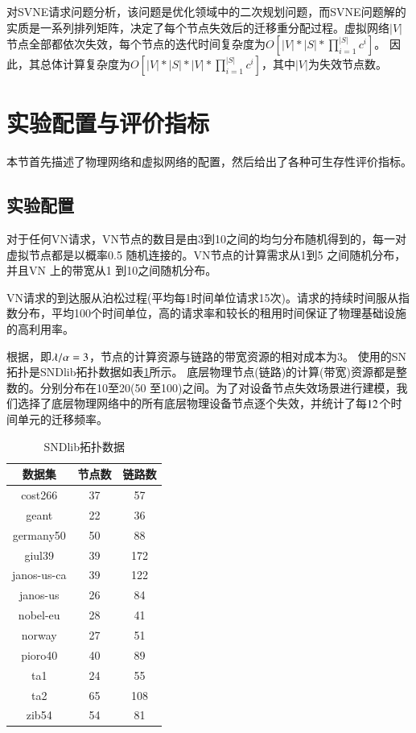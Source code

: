 对SVNE请求问题分析，该问题是优化领域中的二次规划问题，而SVNE问题解的实质是一系列排列矩阵，决定了每个节点失效后的迁移重分配过程。虚拟网络$|V|$节点全部都依次失效，每个节点的迭代时间复杂度为$O[|V|*|S|*\prod_{i=1}^{|S|}c^i]$。 因此，其总体计算复杂度为$O[|V|*|S|*|V|*\prod_{i=1}^{|S|}c^i]$，其中$|V|$为失效节点数。


\section{实验配置与评价指标}
本节首先描述了物理网络和虚拟网络的配置，然后给出了各种可生存性评价指标。
\subsection{实验配置}
对于任何VN请求，VN节点的数目是由3到10之间的均匀分布随机得到的，每一对虚拟节点都是以概率0.5 随机连接的。VN节点的计算需求从1到5 之间随机分布，并且VN 上的带宽从1 到10之间随机分布。

VN请求的到达服从泊松过程(平均每1时间单位请求15次)。请求的持续时间服从指数分布，平均100个时间单位，高的请求率和较长的租用时间保证了物理基础设施的高利用率。

根据\cite{yu2010survivable}，即$\lambda/\alpha=3$，节点的计算资源与链路的带宽资源的相对成本为3。 使用的SN 拓扑是SNDlib拓扑数据\cite{orlowski2010sndlib}如表\ref{tab:SNDlibTopo}所示。 底层物理节点(链路)的计算(带宽)资源都是整数的。分别分布在10至20(50 至100)之间。为了对设备节点失效场景进行建模，我们选择了底层物理网络中的所有底层物理设备节点逐个失效，并统计了每$12$个时间单元的迁移频率。
\begin{table}[htbp]
\centering
\caption{SNDlib拓扑数据}\label{tab:SNDlibTopo}
\begin{tabular}{ccc}
\toprule
  数据集 & 节点数 & 链路数 \\
\midrule
  cost266& 37& 57\\
  geant& 22& 36\\
  germany50& 50& 88\\
  giul39& 39& 172\\
  janos-us-ca& 39& 122\\
  janos-us& 26& 84\\
  nobel-eu& 28& 41\\
  norway& 27& 51\\
  pioro40& 40& 89\\
  ta1& 24& 55\\
  ta2& 65& 108\\
  zib54& 54& 81\\
\bottomrule

\end{tabular}
\end{table}

